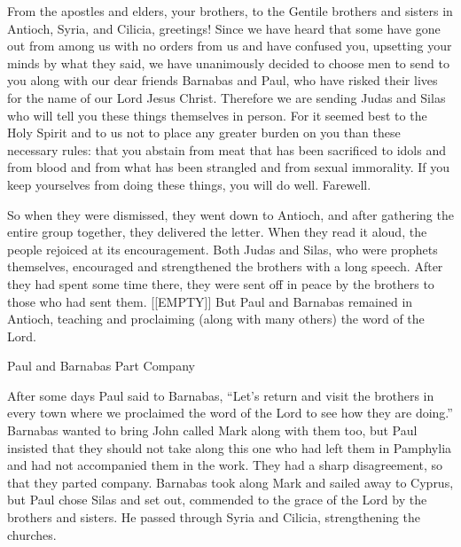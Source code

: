 {\par }{\PI From the apostles
and
elders,
your brothers, to the Gentile
brothers
and sisters in
Antioch,
Syria,
and
Cilicia, greetings!
Since
we have heard
that
some
have gone out from among
us
with no
orders
from us and have confused
you,
upsetting
your
minds by what they said,
we
have
unanimously
decided
to choose
men
to send
to
you
along
with our
dear
friends Barnabas
and
Paul,
who have risked
their
lives
for
the name
of our
Lord
Jesus
Christ.
Therefore
we are sending
Judas
and
Silas
who will tell
you these things
themselves
in
person.
For
it seemed best
to the Holy
Spirit
and
to us
not
to place
any greater
burden
on you
than
these
necessary rules:
that you abstain
from meat that has been sacrificed to idols
and
from blood
and
from what has been strangled
and
from sexual immorality.
If you keep
yourselves
from doing
these things, you will do well.
Farewell.
\par }{\PP {}So
when they were dismissed,
they went down
to
Antioch,
and
after gathering
the entire group
together,
they delivered
the letter.
When
they read
it aloud, the people rejoiced
at
its encouragement.
Both
Judas
and
Silas,
who were
prophets
themselves,
encouraged
and
strengthened
the brothers
with
a
long
speech.
After
they had spent
some time
there, they were sent off
in
peace
by
the brothers
to
those who had sent
them.
[[EMPTY]]
But
Paul
and
Barnabas
remained
in
Antioch,
teaching
and
proclaiming
(along
with
many
others) the word
of the Lord.
\par }{\SH Paul and Barnabas Part Company
\par }{\PP {}After
some
days
Paul
said
to
Barnabas,
“Let’s return
and visit
the brothers
in
every
town
where we proclaimed
the word
of the Lord
to see how
they are doing.”
Barnabas
wanted
to bring
John
called
Mark along with them too,
but
Paul
insisted
that they should not
take along
this one
who had left
them
in
Pamphylia
and
had
not
accompanied
them
in
the work.
They had
a sharp disagreement,
so that
they
parted company.
Barnabas
took along
Mark
and sailed away
to
Cyprus,
but
Paul
chose
Silas
and set out,
commended
to the grace
of the Lord
by
the brothers and sisters.
He passed through
Syria
and
Cilicia,
strengthening
the churches.

}
